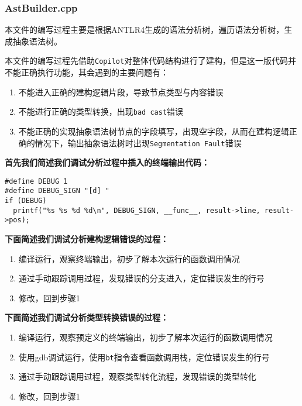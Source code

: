 \documentclass[../main.tex]{subfiles}
\begin{document}
\subsubsection{AstBuilder.cpp}

本文件的编写过程主要是根据ANTLR4生成的语法分析树，遍历语法分析树，生成抽象语法树。

本文件的编写过程先借助\texttt{Copilot}对整体代码结构进行了建构，但是这一版代码并不能正确执行功能，其会遇到的主要问题有：

\begin{enumerate}
	\item 不能进入正确的建构逻辑片段，导致节点类型与内容错误
	\item 不能进行正确的类型转换，出现\texttt{bad cast}错误
	\item 不能正确的实现抽象语法树节点的字段填写，出现空字段，从而在建构逻辑正确的情况下，输出抽象语法树时出现\texttt{Segmentation Fault}错误
\end{enumerate}

\textbf{首先我们简述我们调试分析过程中插入的终端输出代码：}

\begin{mdframed}
  \begin{verbatim}
#define DEBUG 1
#define DEBUG_SIGN "[d] "
if (DEBUG)
  printf("%s %s %d %d\n", DEBUG_SIGN, __func__, result->line, result->pos);
  \end{verbatim}
\end{mdframed}


\textbf{下面简述我们调试分析建构逻辑错误的过程：}

\begin{enumerate}
	\item 编译运行，观察终端输出，初步了解本次运行的函数调用情况
	\item 通过手动跟踪调用过程，发现错误的分支进入，定位错误发生的行号
	\item 修改，回到步骤1
\end{enumerate}


\textbf{下面简述我们调试分析类型转换错误的过程：}

\begin{enumerate}
	\item 编译运行，观察预定义的终端输出，初步了解本次运行的函数调用情况
	\item 使用gdb调试运行，使用\texttt{bt}指令查看函数调用栈，定位错误发生的行号
	\item 通过手动跟踪调用过程，观察类型转化流程，发现错误的类型转化
	\item 修改，回到步骤1
\end{enumerate}
\end{document}
